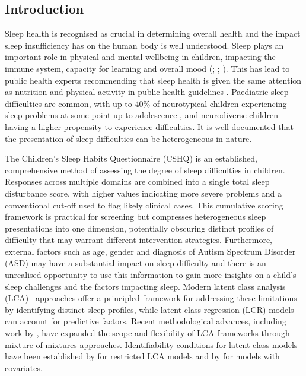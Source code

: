 \documentclass[11pt]{article}
\theoremstyle{plain}
\theoremstyle{definition}
\begin{document}
\subsection{Introduction}
Sleep health is recognised as crucial in determining overall health \citep{meaklim_sleep_2020} and the impact sleep insufficiency has on the human body is well understood. Sleep plays an important role in physical and mental wellbeing in children, impacting the immune system, capacity for learning and overall mood (\citet{antczak_physical_2020}; \citet{matricciani_childrens_2019}; \citet{perry_raising_2013}). This has lead to public health experts recommending that sleep health is given the same attention as nutrition and physical activity in public health guidelines \citep{chaput_sleeping_2018}.  
Paediatric sleep difficulties are common, with up to 40\% of neurotypical children experiencing sleep problems at some point up to adolescence \citep{meltzer_sleep_2014}, and neurodiverse children having a higher propensity to experience difficulties. It is well documented that the presentation of sleep difficulties can be heterogeneous in nature. 

The Children's Sleep Habits Questionnaire (CSHQ) \citep{owens_childrens_2000} is an established, comprehensive method of assessing the degree of sleep difficulties in children. Responses across multiple domains are combined into a single total sleep disturbance score, with higher values indicating more severe problems and a conventional cut‑off used to flag likely clinical cases. This cumulative scoring framework is practical for screening but compresses heterogeneous sleep presentations into one dimension, potentially obscuring distinct profiles of difficulty that may warrant different intervention strategies. Furthermore, external factors such as age, gender and diagnosis of Autism Spectrum Disorder (ASD) may have a substantial impact on sleep difficulty and there is an unrealised opportunity to use this information to gain more insights on a child's sleep challenges and the factors impacting sleep. Modern latent class analysis (LCA)~\citep{goodman_exploratory_1974} approaches offer a principled framework for addressing these limitations by identifying distinct sleep profiles, while latent class regression (LCR) models~\citep{bandeen-roche_latent_1997,bolck_estimating_2004} can account for predictive factors. Recent methodological advances, including work by \citet{malsiner-walli_without_2025}, have expanded the scope and flexibility of LCA frameworks through mixture-of-mixtures approaches. Identifiability conditions for latent class models have been established by \citet{liu_restricted_2024} for restricted LCA models and by \citet{ouyang_identifiability_2022} for models with covariates.
\end{document}
